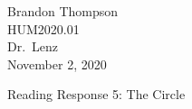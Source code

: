 \noindent
Brandon Thompson \\
HUM2020.01 \\
Dr.\ Lenz \\
November 2, 2020 \\

\begin{center}
Reading Response 5: The Circle
\end{center}
